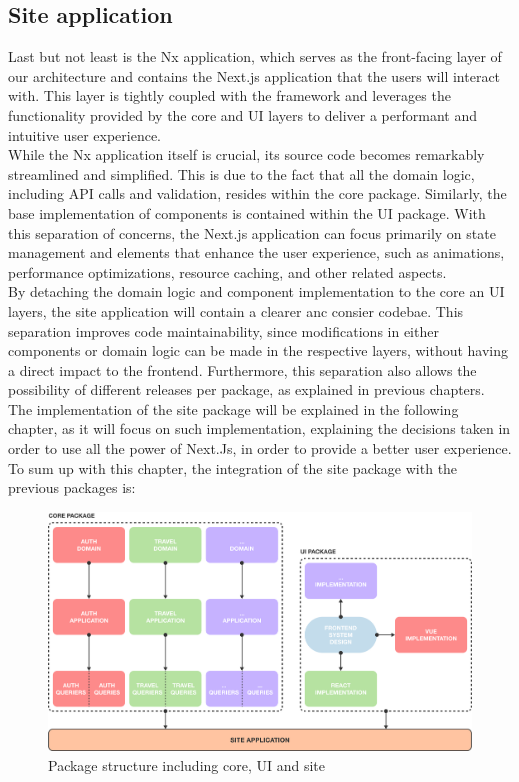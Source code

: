 \documentclass[../design.tex]{subfiles}
\begin{document}
\subsection{Site application}
Last but not least is the Nx application, which serves as the front-facing layer
of our architecture and contains the Next.js application that the users will
interact with. This layer is tightly coupled with the framework and leverages
the functionality provided by the core and UI layers to deliver a performant and
intuitive user experience.
\\[8pt]
While the Nx application itself is crucial, its source code becomes remarkably
streamlined and simplified. This is due to the fact that all the domain logic,
including API calls and validation, resides within the core package. Similarly,
the base implementation of components is contained within the UI package. With
this separation of concerns, the Next.js application can focus primarily on
state management and elements that enhance the user experience, such as
animations, performance optimizations, resource caching, and other related
aspects.
\\
By detaching the domain logic and component implementation to the core an UI
layers, the site application will contain a clearer anc consier codebae. This
separation improves code maintainability, since modifications in either
components or domain logic can be made in the respective layers, without having
a direct impact to the frontend. Furthermore, this separation also allows the
possibility of different releases per package, as explained in previous
chapters.
\\[8pt]
The implementation of the site package will be explained in the following
chapter, as it will focus on such implementation, explaining the decisions taken
in order to use all the power of Next.Js, in order to provide a better user
experience. To sum up with this chapter, the integration of the site package
with the previous packages is:
\begin{figure}[H]
	\centering
	\includegraphics[width=\textwidth]{./assets/ui-core-site.png}
	\caption{Package structure including core, UI and site}
\end{figure}
\end{document}
